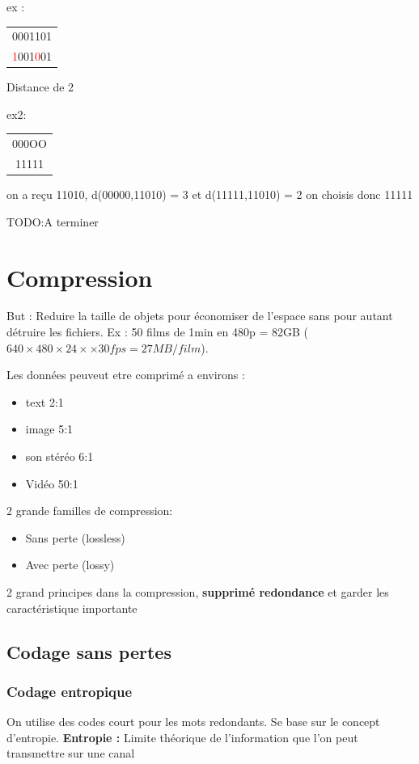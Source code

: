 \documentclass[12pt]{article}
\begin{document}
			ex : 
			\begin{tabular}{c}
			0001101\\
			\textcolor{red}{1}001\textcolor{red}{0}01
			\end{tabular}Distance de 2
			
			ex2:
			
			\begin{tabular}{c}
			000OO\\
			11111
			\end{tabular} on a reçu 11010, d(00000,11010) = 3 et d(11111,11010) = 2 on choisis donc 11111
			
			
			TODO:A terminer
			
\section{Compression}
	But : Reduire la taille de objets pour économiser de l'espace sans pour autant détruire les fichiers. Ex : 50 films de 1min en 480p = 82GB ($640 \times 480 \times 24 \times \times 30fps = 27MB/film$).

	Les données peuveut etre comprimé a environs :
	\begin{itemize}
		\item text 2:1
		\item image 5:1
		\item son stéréo 6:1
		\item Vidéo 50:1
	\end{itemize}
	
	2 grande familles de compression:
	\begin{itemize}
		\item Sans perte (lossless)
		\item Avec perte (lossy)
	\end{itemize}

	2 grand principes dans la compression, \textbf{supprimé redondance} et garder les caractéristique importante
	
	\subsection{Codage sans pertes}
		\subsubsection{Codage entropique}
			On utilise des codes court pour les mots redondants. Se base sur le concept d'entropie. \textbf{Entropie :} Limite théorique de l'information que l'on peut transmettre sur une canal
			
\end{document}
